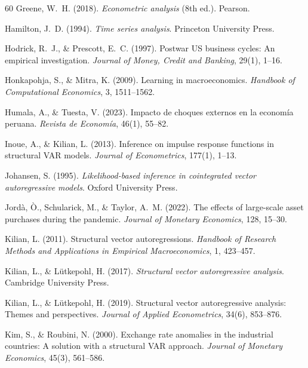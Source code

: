 \documentclass[12pt,a4paper]{article}
\begin{document}
\begin{thebibliography}{60}
 Greene, W.~H. (2018). \textit{Econometric analysis} (8th ed.). Pearson.

 Hamilton, J.~D. (1994). \textit{Time series analysis}. Princeton University Press.

 Hodrick, R.~J., \& Prescott, E.~C. (1997). Postwar US business cycles: An empirical investigation. \textit{Journal of Money, Credit and Banking}, 29(1), 1--16.

 Honkapohja, S., \& Mitra, K. (2009). Learning in macroeconomics. \textit{Handbook of Computational Economics}, 3, 1511--1562.

 Humala, A., \& Tuesta, V. (2023). Impacto de choques externos en la economía peruana. \textit{Revista de Economía}, 46(1), 55--82.

 Inoue, A., \& Kilian, L. (2013). Inference on impulse response functions in structural VAR models. \textit{Journal of Econometrics}, 177(1), 1--13.

 Johansen, S. (1995). \textit{Likelihood-based inference in cointegrated vector autoregressive models}. Oxford University Press.

 Jordà, Ò., Schularick, M., \& Taylor, A.~M. (2022). The effects of large-scale asset purchases during the pandemic. \textit{Journal of Monetary Economics}, 128, 15--30.

 Kilian, L. (2011). Structural vector autoregressions. \textit{Handbook of Research Methods and Applications in Empirical Macroeconomics}, 1, 423--457.

 Kilian, L., \& Lütkepohl, H. (2017). \textit{Structural vector autoregressive analysis}. Cambridge University Press.

 Kilian, L., \& Lütkepohl, H. (2019). Structural vector autoregressive analysis: Themes and perspectives. \textit{Journal of Applied Econometrics}, 34(6), 853--876.

 Kim, S., \& Roubini, N. (2000). Exchange rate anomalies in the industrial countries: A solution with a structural VAR approach. \textit{Journal of Monetary Economics}, 45(3), 561--586.


\end{thebibliography}
\end{document}
